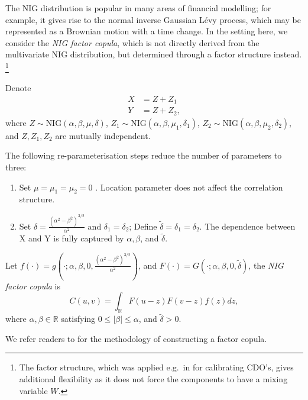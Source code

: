 The NIG distribution is popular in many areas of
financial modelling; for example, it gives rise 
to the normal inverse Gaussian L\'evy process, which may be represented
as a Brownian motion with a time change.
In the setting here, we consider the {\em NIG factor copula}, which is
not directly derived from the multivariate NIG distribution, but
determined through a factor structure instead. \footnote{The factor structure,
which was applied e.g.\ in \citep{Kalemanova2007} for calibrating CDO's,
gives additional flexibility as it does not force the components to
have a mixing variable $W$.}

Denote 
\begin{align*}
  X &= Z + Z_1 \\ 
  Y &= Z + Z_2,
  \end{align*}
where $Z \sim \text{NIG}(\alpha, \beta, \mu, \delta)$, $Z_1 \sim \text{NIG}(\alpha, \beta, \mu_1, \delta_1)$, 
$Z_2 \sim \text{NIG}(\alpha, \beta, \mu_2, \delta_2)$, and $Z, Z_1, Z_2$ are mutually independent. 

The following re-parameterisation steps reduce the number of parameters to three:
\begin{enumerate}
  \item Set $\mu = \mu_1= \mu_2 = 0$ . Location parameter does not affect the correlation structure.
  \item Set $\delta = \frac{(\alpha^2-\beta^2)^{3/2}}{\alpha^2}$ and $\delta_1 = \delta_2$; Define $\tilde \delta = \delta_1 = \delta_2$. 
  The dependence between X and Y is fully captured by $\alpha, \beta$, and $\tilde \delta$.  
\end{enumerate}

\begin{prop}
  Let $f(\cdot) = g\left(\cdot; \alpha, \beta, 0, \frac{(\alpha^2-\beta^2)^{3/2}}{\alpha^2}
  \right)$, and $F (\cdot) = G(\cdot; \alpha, \beta, 0, \tilde \delta)$, 
  the {\em NIG factor copula} is 
  \begin{equation*}
    C(u,v) = \int_\mathbb{R} F(u-z)F(v-z)f(z)dz,
  \end{equation*}
  where $\alpha, \beta \in \mathbb{R}$ satisfying $0 \leq |\beta| \leq \alpha$, and $\tilde \delta >0 $.
\end{prop}

We refer readers to \cite{krupskii2013factor} for the methodology of constructing a factor copula. 

